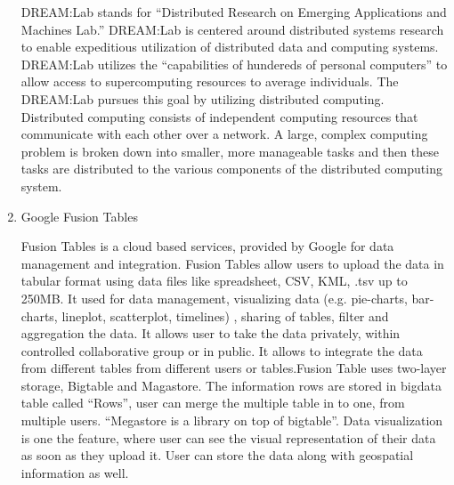 \begin{enumerate}
DREAM:Lab stands for “Distributed Research on Emerging
Applications and Machines Lab.” \label{\detokenize{i524/technologies:id120}}{\hyperref[\detokenize{i524/technologies:dream}]{\sphinxcrossref{{[}107{]}}}} DREAM:Lab is
centered around distributed systems research to enable expeditious
utilization of distributed data and computing
systems. \label{\detokenize{i524/technologies:id121}}{\hyperref[\detokenize{i524/technologies:dream}]{\sphinxcrossref{{[}107{]}}}} DREAM:Lab utilizes the “capabilities of
hundereds of personal computers” to allow access to supercomputing
resources to average individuals. \label{\detokenize{i524/technologies:id122}}{\hyperref[\detokenize{i524/technologies:rao}]{\sphinxcrossref{{[}108{]}}}} The DREAM:Lab
pursues this goal by utilizing distributed computing. \label{\detokenize{i524/technologies:id123}}{\hyperref[\detokenize{i524/technologies:rao}]{\sphinxcrossref{{[}108{]}}}}
Distributed computing consists of independent computing resources
that communicate with each other over a network. \label{\detokenize{i524/technologies:id124}}{\hyperref[\detokenize{i524/technologies:denero}]{\sphinxcrossref{{[}109{]}}}} A
large, complex computing problem is broken down into smaller, more
manageable tasks and then these tasks are distributed to the
various components of the distributed computing
system. \label{\detokenize{i524/technologies:id125}}{\hyperref[\detokenize{i524/technologies:denero}]{\sphinxcrossref{{[}109{]}}}}

\item {} 
Google Fusion Tables

Fusion Tables is a cloud based services, provided by Google for
data management and integration. Fusion Tables allow users to
upload the data in tabular format using data files like
spreadsheet, CSV, KML, .tsv up to
250MB. \label{\detokenize{i524/technologies:id126}}{\hyperref[\detokenize{i524/technologies:www-fusiontablesupport}]{\sphinxcrossref{{[}110{]}}}} It used for data management,
visualizing data (e.g. pie-charts, bar-charts, lineplot,
scatterplot, timelines) \label{\detokenize{i524/technologies:id127}}{\hyperref[\detokenize{i524/technologies:wiki-fusiontable}]{\sphinxcrossref{{[}111{]}}}} , sharing of
tables, filter and aggregation the data. It allows user to take
the data privately, within controlled collaborative group or in
public. It allows to integrate the data from different tables from
different users or tables.Fusion Table uses two-layer storage,
Bigtable and Magastore. The information rows are stored in bigdata
table called “Rows”, user can merge the multiple table in to one,
from multiple users. “Megastore is a library on top of
bigtable”. \label{\detokenize{i524/technologies:id128}}{\hyperref[\detokenize{i524/technologies:googlefusiontable2012}]{\sphinxcrossref{{[}112{]}}}} Data visualization is one
the feature, where user can see the visual representation of their
data as soon as they upload it. User can store the data along with
geospatial information as well.


\end{enumerate}
